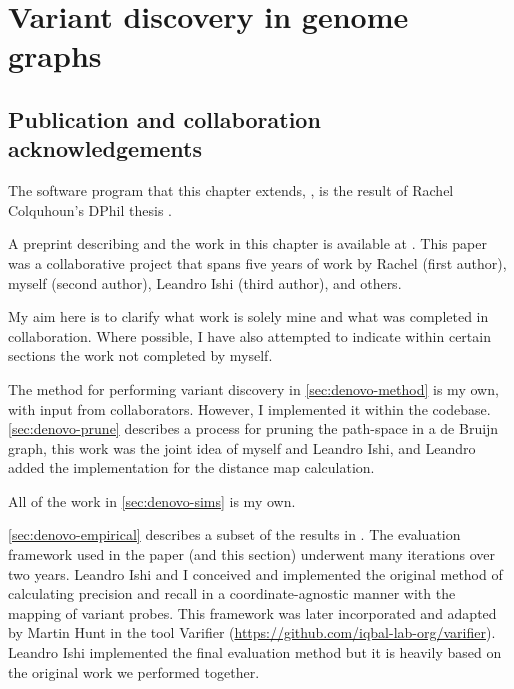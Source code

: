 
\chapter{Variant discovery in genome graphs}
\label{chap:denovo}
\ifpdf
    \graphicspath{{Chapter1/Figs/Raster/}{Chapter1/Figs/PDF/}{Chapter1/Figs/}}
\else
    \graphicspath{{Chapter1/Figs/Vector/}{Chapter1/Figs/}}
\fi
\setcounter{section}{-1}
\section{Publication and collaboration acknowledgements}
\label{sec:denovo-acknowledge}

The software program that this chapter extends, \pandora{}, is the result of Rachel Colquhoun's DPhil thesis \cite{rachelthesis}.

A preprint describing \pandora{} and the work in this chapter is available at \cite{pandora}. This paper was a collaborative project that spans five years of work by Rachel (first author), myself (second author), Leandro Ishi (third author), and others.

My aim here is to clarify what work is solely mine and what was completed in collaboration. Where possible, I have also attempted to indicate within certain sections the work not completed by myself.

The method for performing \denovo{} variant discovery in \autoref{sec:denovo-method} is my own, with input from collaborators. However, I implemented it within the \pandora{} codebase. \autoref{sec:denovo-prune} describes a process for pruning the path-space in a de Bruijn graph, this work was the joint idea of myself and Leandro Ishi, and Leandro added the implementation for the distance map calculation.

All of the work in \autoref{sec:denovo-sims} is my own.

\autoref{sec:denovo-empirical} describes a subset of the results in \cite{pandora}. The evaluation framework used in the paper (and this section) underwent many iterations over two years. Leandro Ishi and I conceived and implemented the original method of calculating precision and recall in a coordinate-agnostic manner with the mapping of variant probes. This framework was later incorporated and adapted by Martin Hunt in the tool Varifier (\url{https://github.com/iqbal-lab-org/varifier}). Leandro Ishi implemented the final evaluation method but it is heavily based on the original work we performed together.

